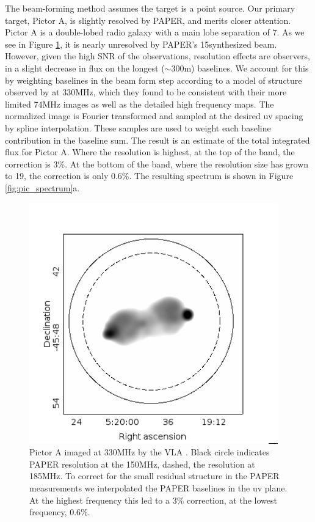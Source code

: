 \documentclass[preprint]{aastex}
\begin{document}
The beam-forming method assumes the target is a point source. Our primary target, Pictor A, is slightly resolved by PAPER, and merits closer attention. Pictor A is a double-lobed radio galaxy with a main lobe separation of 7\arcmin. As we see in Figure \ref{fig:pic_perley}, it is nearly unresolved by PAPER's 15\arcmin synthesized beam. However, given the high SNR of the observations, resolution effects are observers, in a slight decrease in flux on the longest ($\sim$300m) baselines. We account for this by weighting baselines in the beam form step according to a model of structure observed by \citet{Perley:1997p9312} at 330MHz, which they found to be consistent with their more limited 74MHz images as well as the detailed high frequency maps.  The normalized image is Fourier transformed and sampled at the desired uv spacing by spline interpolation. These samples are used to weight each baseline contribution in the baseline sum. The result is an estimate of the total integrated flux for Pictor A. Where the resolution is highest, at the top of the band, the correction is 3\%. At the bottom of the band, where the resolution size has grown to 19\arcmin, the correction is only 0.6\%. The resulting spectrum is shown in Figure \ref{fig:pic_spectrum}a.
\begin{figure}
\includegraphics[width=0.96\textwidth]{plots/picA_Perley.png}
\caption{Pictor A imaged at 330MHz by the VLA \citep{Perley:1997p9312}. Black circle indicates PAPER resolution at the 150MHz, dashed, the resolution at 185MHz.  To correct for the small residual structure in the PAPER measurements we interpolated the PAPER baselines in the uv plane. At the highest frequency this led to a 3\% correction, at the lowest frequency, 0.6\%.  \label{fig:pic_perley}}
\end{figure}
\end{document}
